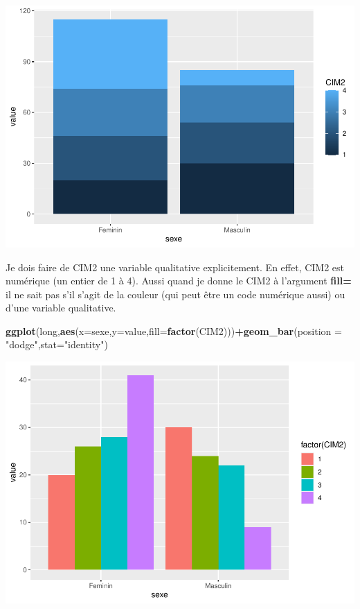 \documentclass[
]{book}
\newenvironment{Shaded}{\begin{snugshade}}{\end{snugshade}}
\newcommand{\AttributeTok}[1]{\textcolor[rgb]{0.13,0.29,0.53}{#1}}
\newcommand{\FunctionTok}[1]{\textcolor[rgb]{0.13,0.29,0.53}{\textbf{#1}}}
\newcommand{\NormalTok}[1]{#1}
\newcommand{\SpecialCharTok}[1]{\textcolor[rgb]{0.81,0.36,0.00}{\textbf{#1}}}
\newcommand{\StringTok}[1]{\textcolor[rgb]{0.31,0.60,0.02}{#1}}
\begin{document}
\includegraphics{_main_files/figure-latex/ggplot30-1.pdf}

Je dois faire de CIM2 une variable qualitative explicitement. En effet, CIM2 est numérique
(un entier de 1 à 4). Aussi quand je donne le CIM2 à l'argument \textbf{fill=} il ne sait pas
s'il s'agit de la couleur (qui peut être un code numérique aussi) ou d'une variable qualitative.

\begin{Shaded}
\begin{Highlighting}[]
\FunctionTok{ggplot}\NormalTok{(long,}\FunctionTok{aes}\NormalTok{(}\AttributeTok{x=}\NormalTok{sexe,}\AttributeTok{y=}\NormalTok{value,}\AttributeTok{fill=}\FunctionTok{factor}\NormalTok{(CIM2)))}\SpecialCharTok{+}\FunctionTok{geom\_bar}\NormalTok{(}\AttributeTok{position =} \StringTok{"dodge"}\NormalTok{,}\AttributeTok{stat=}\StringTok{"identity"}\NormalTok{)}
\end{Highlighting}
\end{Shaded}

\includegraphics{_main_files/figure-latex/ggplot31-1.pdf}
\end{document}

